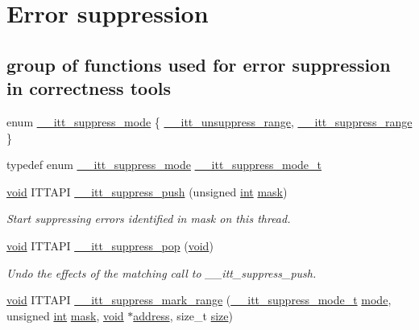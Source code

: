 \hypertarget{group__suppress}{\section{Error suppression}
\label{group__suppress}
}
\subsection*{group of functions used for error suppression in correctness tools}
\begin{DoxyCompactItemize}
\item 
enum \hyperlink{group__suppress_ga2f22a362ce18331383ba16fea9d9b94d}{\-\_\-\-\_\-itt\-\_\-suppress\-\_\-mode} \{ \hyperlink{group__suppress_gga2f22a362ce18331383ba16fea9d9b94dadcd4eae9f146ca28ffcbdb496a8cbb26}{\-\_\-\-\_\-itt\-\_\-unsuppress\-\_\-range}, 
\hyperlink{group__suppress_gga2f22a362ce18331383ba16fea9d9b94da644060c87161325eb973d947191f08eb}{\-\_\-\-\_\-itt\-\_\-suppress\-\_\-range}
 \}
\item 
typedef enum \hyperlink{group__suppress_ga2f22a362ce18331383ba16fea9d9b94d}{\-\_\-\-\_\-itt\-\_\-suppress\-\_\-mode} \hyperlink{group__suppress_ga63fa4a192bd1e53599c2e58fe4527b5a}{\-\_\-\-\_\-itt\-\_\-suppress\-\_\-mode\-\_\-t}
\item 
\hyperlink{ittnotify__static_8h_af941d56e55e3c5465135b60c4d6343ed}{void} I\-T\-T\-A\-P\-I \hyperlink{group__suppress_gaee6d74a43f8ae7e60b397e103d973946}{\-\_\-\-\_\-itt\-\_\-suppress\-\_\-push} (unsigned \hyperlink{ittnotify__static_8h_a8b8dcd723308a8cb5d84277c7a3fff70}{int} \hyperlink{ittnotify__static_8h_aa2c7de905e06240a7170f2a0da3a5abf}{mask})
\begin{DoxyCompactList}\small\item\em Start suppressing errors identified in mask on this thread. \end{DoxyCompactList}\item 
\hyperlink{ittnotify__static_8h_af941d56e55e3c5465135b60c4d6343ed}{void} I\-T\-T\-A\-P\-I \hyperlink{group__suppress_ga5036bae7bba4aac6b63795f1566d7fc2}{\-\_\-\-\_\-itt\-\_\-suppress\-\_\-pop} (\hyperlink{ittnotify__static_8h_af941d56e55e3c5465135b60c4d6343ed}{void})
\begin{DoxyCompactList}\small\item\em Undo the effects of the matching call to \-\_\-\-\_\-itt\-\_\-suppress\-\_\-push. \end{DoxyCompactList}\item 
\hyperlink{ittnotify__static_8h_af941d56e55e3c5465135b60c4d6343ed}{void} I\-T\-T\-A\-P\-I \hyperlink{group__suppress_gad71a60677f91afc54978e840170a71fd}{\-\_\-\-\_\-itt\-\_\-suppress\-\_\-mark\-\_\-range} (\hyperlink{group__suppress_ga63fa4a192bd1e53599c2e58fe4527b5a}{\-\_\-\-\_\-itt\-\_\-suppress\-\_\-mode\-\_\-t} \hyperlink{ittnotify__static_8h_aaa96ee29dca0e28ad6edad4c36f62080}{mode}, unsigned \hyperlink{ittnotify__static_8h_a8b8dcd723308a8cb5d84277c7a3fff70}{int} \hyperlink{ittnotify__static_8h_aa2c7de905e06240a7170f2a0da3a5abf}{mask}, \hyperlink{ittnotify__static_8h_af941d56e55e3c5465135b60c4d6343ed}{void} $\ast$\hyperlink{ittnotify__static_8h_a1021b0467711f8c9fbede1314244a832}{address}, size\-\_\-t \hyperlink{ittnotify__static_8h_a5a1daa0c1d342747e3884fa54fc64fb1}{size})

\end{DoxyCompactItemize}
